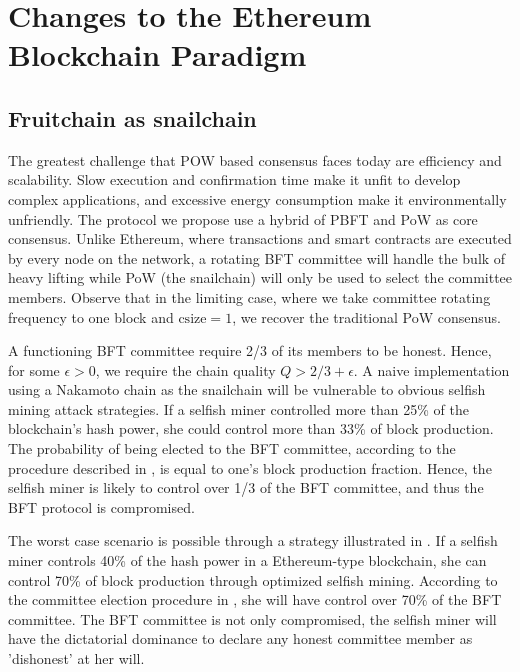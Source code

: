 \section{Changes to the Ethereum Blockchain Paradigm}

\subsection{Fruitchain as snailchain}

The greatest challenge that POW based consensus faces today are efficiency and scalability. Slow execution and confirmation time make it unfit to develop complex applications, and excessive energy consumption make it environmentally unfriendly. The protocol we propose use a hybrid of PBFT and PoW as core consensus. Unlike Ethereum, where transactions and smart contracts are executed by every node on the network, a rotating BFT committee will handle the bulk of heavy lifting while PoW (the snailchain) will only be used to select the committee members. Observe that in the limiting case, where we take committee rotating frequency to one block and $\mathrm{csize} = 1$, we recover the traditional PoW consensus. 

A functioning BFT committee require 2/3 of its members to be honest\cite{castro1999practical}. Hence, for some $\epsilon > 0$, we require the chain quality $Q > 2/3 + \epsilon$. A naive implementation using a Nakamoto chain as the snailchain will be vulnerable to obvious selfish mining attack strategies. If a selfish miner controlled more than 25\% of the blockchain's hash power, she could control more than 33\% of block production\cite{naya2015stub}\cite{eyal2013self}. The probability of being elected to the BFT committee, according to the procedure described in \cite{pass2017hybrid}, is equal to one's block production fraction. Hence, the selfish miner is likely to control over 1/3 of the BFT committee, and thus the BFT protocol is compromised. 

The worst case scenario is possible through a strategy illustrated in \cite{ritz2018uncle}. If a selfish miner controls 40\% of the hash power in a Ethereum-type blockchain, she can control 70\% of block production through optimized selfish mining. According to the committee election procedure in \cite{pass2017hybrid}, she will have control over 70\% of the BFT committee. The BFT committee is not only compromised, the selfish miner will have the dictatorial dominance to declare any honest committee member as 'dishonest' at her will. 

